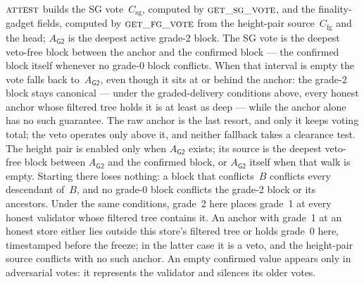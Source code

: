 \documentclass{article}
\theoremstyle{plain}
\theoremstyle{definition}
\theoremstyle{remark}
\newcommand{\Gtwo}{\mathsf{G2}}
\newcommand{\Csg}{C_{\mathrm{sg}}}
\newcommand{\Cfg}{C_{\mathrm{fg}}}
\newcommand{\Agtwo}{A_{\Gtwo}}
\begin{document}
$\Call{attest}{}$ builds the SG vote~$\Csg$, computed by
$\Call{get\_sg\_vote}{}$, and the finality-gadget fields, computed by
$\Call{get\_fg\_vote}{}$ from the height-pair source~$\Cfg$ and the
head; $\Agtwo$ is the deepest active grade-2 block.  The SG vote is the deepest
veto-free block between the anchor and the confirmed block --- the
confirmed block itself whenever no grade-0 block conflicts.  When that
interval is empty the vote falls back to~$\Agtwo$, even though
it sits at or behind the anchor: the grade-2 block stays canonical ---
under the graded-delivery conditions above, every honest anchor whose
filtered tree holds it is at least as
deep --- while the anchor alone has no such guarantee.  The raw anchor is the last resort, and only it
keeps voting total; the veto operates only above it, and neither
fallback takes a clearance test.  The height pair is enabled only when
$\Agtwo$ exists; its source is the deepest veto-free block between
$\Agtwo$ and the confirmed block, or $\Agtwo$ itself when that
walk is empty.  Starting there loses nothing: a block that
conflicts~$B$ conflicts every descendant of~$B$, and no grade-0 block
conflicts the grade-2 block or its ancestors.  Under the same conditions,
grade~2 here places grade~1 at every honest validator whose filtered tree
contains it.  An
anchor with grade~1 at an honest store either lies outside this store's
filtered tree or holds grade~0 here, timestamped before the freeze; in
the latter case it is a veto, and the height-pair source conflicts with
no such anchor.  An empty confirmed value appears only
in adversarial votes: it represents the validator and silences its older
votes.
\end{document}
